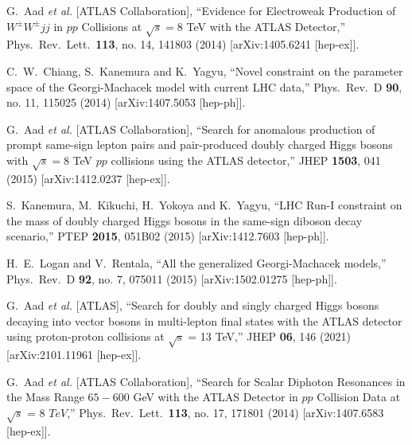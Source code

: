 \documentclass[11pt]{article}
\begin{document}
\begin{thebibliography}{99}
  G.~Aad {\it et al.} [ATLAS Collaboration],
  ``Evidence for Electroweak Production of $W^{\pm}W^{\pm}jj$ in $pp$ Collisions at $\sqrt{s}=8$ TeV with the ATLAS Detector,''
  Phys.\ Rev.\ Lett.\  {\bf 113}, no. 14, 141803 (2014)
  [arXiv:1405.6241 [hep-ex]].

  C.~W.~Chiang, S.~Kanemura and K.~Yagyu,
  ``Novel constraint on the parameter space of the Georgi-Machacek model with current LHC data,''
  Phys.\ Rev.\ D {\bf 90}, no. 11, 115025 (2014)
  [arXiv:1407.5053 [hep-ph]].
      
  G.~Aad {\it et al.} [ATLAS Collaboration],
  ``Search for anomalous production of prompt same-sign lepton pairs and pair-produced doubly charged Higgs bosons with $ \sqrt{s}=8 $ TeV $pp$ collisions using the ATLAS detector,''
  JHEP {\bf 1503}, 041 (2015)
  [arXiv:1412.0237 [hep-ex]].

  S.~Kanemura, M.~Kikuchi, H.~Yokoya and K.~Yagyu,
  ``LHC Run-I constraint on the mass of doubly charged Higgs bosons in the same-sign diboson decay scenario,''
  PTEP {\bf 2015}, 051B02 (2015)
  [arXiv:1412.7603 [hep-ph]].

  H.~E.~Logan and V.~Rentala,
  ``All the generalized Georgi-Machacek models,''
  Phys.\ Rev.\ D {\bf 92}, no. 7, 075011 (2015)
  [arXiv:1502.01275 [hep-ph]].
  
G.~Aad \textit{et al.} [ATLAS],
``Search for doubly and singly charged Higgs bosons decaying into vector bosons in multi-lepton final states with the ATLAS detector using proton-proton collisions at $ \sqrt{\mathrm{s}} $ = 13 TeV,''
JHEP \textbf{06}, 146 (2021)
[arXiv:2101.11961 [hep-ex]].

  G.~Aad {\it et al.} [ATLAS Collaboration],
  ``Search for Scalar Diphoton Resonances in the Mass Range $65-600$ GeV with the ATLAS Detector in $pp$ Collision Data at $\sqrt{s}$ = 8 $TeV$,''
  Phys.\ Rev.\ Lett.\  {\bf 113}, no. 17, 171801 (2014)
  [arXiv:1407.6583 [hep-ex]].
  

\end{thebibliography}
\end{document}
